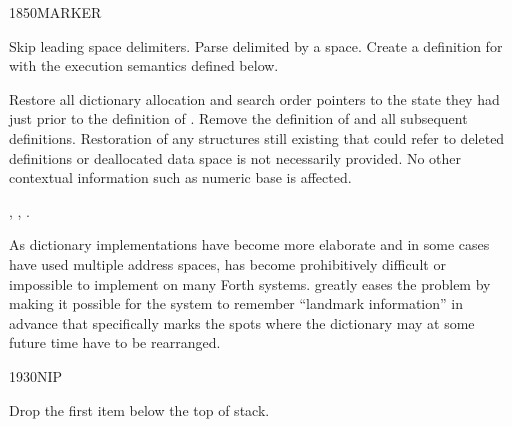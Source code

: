 \newpage
\begin{worddef}{1850}{MARKER}
\item {}

	Skip leading space delimiters. Parse  delimited by
	a space. Create a definition for  with the execution
	semantics defined below.

\execute[name]
	\stack{}{}

	Restore all dictionary allocation and search order pointers to
	the state they had just prior to the definition of .
	Remove the definition of  and all subsequent
	definitions. Restoration of any structures still existing that
	could refer to deleted definitions or deallocated data space is
	not necessarily provided. No other contextual information such
	as numeric base is affected.

\see {},
	,
	.

	\begin{rationale} %
		As dictionary implementations have become more elaborate
		and in some cases have used multiple address spaces,
		 has become prohibitively difficult or
		impossible to implement on many Forth systems. 
		greatly eases the problem by making it possible for the
		system to remember ``landmark information'' in advance that
		specifically marks the spots where the dictionary may at some
		future time have to be rearranged.
	\end{rationale}
\end{worddef}


\begin{worddef}{1930}{NIP}
\item {}

	Drop the first item below the top of stack.
\end{worddef}



